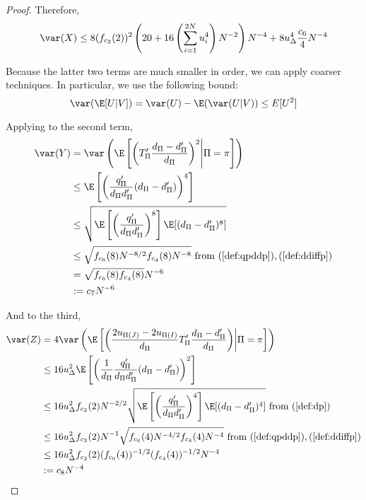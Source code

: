 \begin{proof}
  Therefore,
  \begin{equation*}
    \var(X) \leq 8(f_{c_2}(2))^2 \left ( 20 + 16 \left ( \sum_{i=1}^{2N} u_{i}^4 \right )N^{-2}
    \right ) N^{-4}
    + 8u_{\Delta}^4 \frac{c_6}{4} N^{-4}
  \end{equation*}

  Because the latter two terms are much smaller in order, we can apply
  coarser techniques.  In particular, we use the following bound:
  \begin{equation*}
    \var (\E[U|V]) = \var(U) - \E (\var (U|V)) \leq E[U^2]
  \end{equation*}

  Applying to the second term,
  \begin{align*}
    \var(Y) &= \var \left ( \E \left [ \left ( T'_{\Pi}\frac{d_{\Pi}-d_{\Pi}'}{d_{\Pi}} \right )^2
        \middle | \Pi = \pi \right ] \right ) \\
    &\leq \E \left [ \left ( \frac{q_{\Pi}'}{d_{\Pi}d_{\Pi}'} (d_{\Pi}-d_{\Pi}') \right )^4 \right ] \\
    &\leq \sqrt{\E \left [ \left ( \frac{q_{\Pi}'}{d_{\Pi}d_{\Pi}'} \right )^8 \right ]
      \E [(d_{\Pi}-d_{\Pi}')^8]} \\
    &\leq \sqrt{f_{c_6}(8) N^{-8/2} f_{c_4}(8) N^{-8}} \text{ from }
    (\ref{def:qpddp}),(\ref{def:ddiffp}) \\
    &= \sqrt{f_{c_6}(8)f_{c_4}(8)}N^{-6} \\
    &:= c_7 N^{-6}
  \end{align*}

  And to the third,
  \begin{align*}
    \var(Z) &= 4 \var \left ( \E \left [ \left ( \frac{2u_{\Pi(J)}-2u_{\Pi(I)}}{d_{\Pi}}
          T_{\Pi}'\frac{d_{\Pi}-d_{\Pi}'}{d_{\Pi}} \right ) \middle | \Pi = \pi \right ] \right ) \\
    &\leq 16 u_{\Delta}^2 \E \left [ \left ( \frac{1}{d_{\Pi}} \frac{q_{\Pi}'}{d_{\Pi}d_{\Pi}'}
        (d_{\Pi}-d_{\Pi}') \right )^2 \right ] \\
    &\leq 16 u_{\Delta}^2 f_{c_2}(2) N^{-2/2} \sqrt{\E \left [ \left (
          \frac{q_{\Pi}'}{d_{\Pi}d_{\Pi}'} \right )^4 \right ] \E[(d_{\Pi}-d_{\Pi}')^4]
    } \text{ from } (\ref{def:dp}) \\
    &\leq 16 u_{\Delta}^2 f_{c_2}(2) N^{-1} \sqrt{f_{c_6}(4) N^{-4/2} f_{c_4}(4) N^{-4}}
    \text{ from } (\ref{def:qpddp}),(\ref{def:ddiffp}) \\
    &\leq 16 u_{\Delta}^2 f_{c_2}(2) (f_{c_6}(4))^{-1/2} (f_{c_4}(4))^{-1/2} N^{-4} \\
    &:= c_8 N^{-4}
  \end{align*}


\end{proof}
